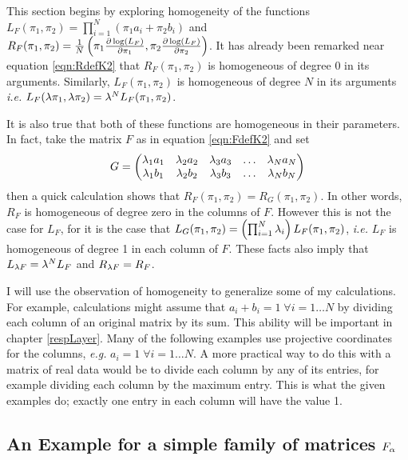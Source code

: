 \label{sect:simpleEg}
This section begins by exploring homogeneity of the functions \( L_F(\pi_1,\pi_2) =  \prod_{i=1}^N (\pi_1a_i+\pi_2b_i)\) and \( R_F(\pi_1,\pi_2) = \frac 1N \left(\pi_1\pdv{\log(L_F)}{\pi_1} ,\pi_2\pdv{\log(L_F)}{\pi_2} \right) \).  It has already been remarked near equation \eqref{eqn:RdefK2} that \( R_F(\pi_1,\pi_2) \) is homogeneous of degree 0 in its arguments.  Similarly, \( L_F(\pi_1,\pi_2) \) is homogeneous of degree \( N \) in its arguments \textit{i.e.} \( L_F(\lambda\pi_1,\lambda\pi_2) =  \lambda^NL_F(\pi_1,\pi_2)  \).

It is also true that both of these functions are homogeneous in their parameters. In fact, take the matrix \( F \) as in equation \ref{eqn:FdefK2} and set 
\begin{equation}\label{eqn:GdefK2hom}
G=
\begin{pmatrix}
\lambda_1a_1 & \lambda_2a_2 & \lambda_3a_3 & \ldots & \lambda_Na_N\\
\lambda_1b_1 & \lambda_2b_2 & \lambda_3b_3 & \ldots & \lambda_Nb_N
\end{pmatrix}
\end{equation} 
then a quick calculation shows that \( R_F(\pi_1,\pi_2) = R_G(\pi_1,\pi_2)\).  In other words, \( R_F \) is homogeneous of degree zero in the columns of \( F \).  However this is not the case for \( L_F \), for it is the case that \( L_G(\pi_1,\pi_2) = \left(\prod_{i=1}^{N}\lambda_i\right)L_F(\pi_1,\pi_2) \), \textit{i.e.} \( L_F \) is homogeneous of degree 1 in each column of \( F \).  These facts also imply that \( L_{\lambda F} = \lambda^{N}L_F \) and \( R_{\lambda F} = R_F \).

I will use the observation of homogeneity to generalize some of my calculations.  For example, calculations might assume that \( a_i + b_i = 1\;\forall i=1\ldots N \) by dividing each column of an original matrix by its sum. This ability will be important in chapter \ref{respLayer}. Many of the following examples use projective coordinates for the columns, \textit{e.g.} \( a_i = 1\;\forall i=1\ldots N\).  A more practical way to do this with a matrix of real data would be to divide each column by any of its entries, for example dividing each column by the maximum entry.  This is what the given examples do; exactly one entry in each column will have the value 1.

\subsection{An Example for a simple family of matrices \( F_\alpha \)}

